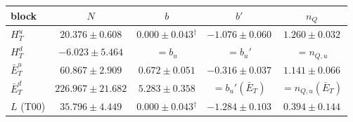 \begin{tabular}{lcccc}
\toprule
block & $N$ & $b$ & $b'$ & $n_Q$ \\
\midrule
$H_T^u$ & $20.376 \pm 0.608$ & $0.000 \pm 0.043$$^{\dagger}$ & $-1.076 \pm 0.060$ & $1.260 \pm 0.032$ \\
$H_T^d$ & $-6.023 \pm 5.464$ & $=b_u$ & $=b_u'$ & $=n_{Q,u}$ \\
$\bar E_T^u$ & $60.867 \pm 2.909$ & $0.672 \pm 0.051$ & $-0.316 \pm 0.037$ & $1.141 \pm 0.066$ \\
$\bar E_T^d$ & $226.967 \pm 21.682$ & $5.283 \pm 0.358$ & $=b_u'(\bar E_T)$ & $=n_{Q,u}(\bar E_T)$ \\
$L$ (T00) & $35.796 \pm 4.449$ & $0.000 \pm 0.043$$^{\dagger}$ & $-1.284 \pm 0.103$ & $0.394 \pm 0.144$ \\
\bottomrule
\end{tabular}
